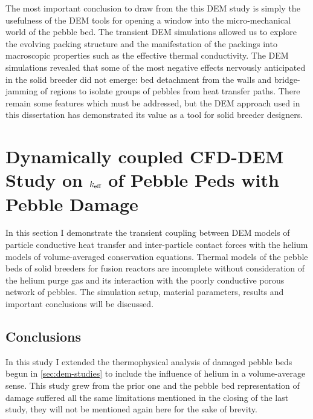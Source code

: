 The most important conclusion to draw from the this DEM study is simply the usefulness of the DEM tools for opening a window into the micro-mechanical world of the pebble bed. The transient DEM simulations allowed us to explore the evolving packing structure and the manifestation of the packings into macroscopic properties such as the effective thermal conductivity. The DEM simulations revealed that some of the most negative effects nervously anticipated in the solid breeder did not emerge: bed detachment from the walls and bridge-jamming of regions to isolate groups of pebbles from heat transfer paths. There remain some features which must be addressed, but the DEM approach used in this dissertation has demonstrated its value as a tool for solid breeder designers. 












\section{Dynamically coupled CFD-DEM Study on $k_\text{eff}$ of Pebble Peds with Pebble Damage}\label{sec:cfd-dem-studies}

In this section I demonstrate the transient coupling between DEM models of particle conductive heat transfer and inter-particle contact forces with the helium models of volume-averaged conservation equations. Thermal models of the pebble beds of solid breeders for fusion reactors are incomplete without consideration of the helium purge gas and its interaction with the poorly conductive porous network of pebbles. The simulation setup, material parameters, results and important conclusions will be discussed.





\subsection{Conclusions}

In this study I extended the thermophysical analysis of damaged pebble beds begun in \cref{sec:dem-studies} to include the influence of helium in a volume-average sense. This study grew from the prior one and the pebble bed representation of damage suffered all the same limitations mentioned in the closing of the last study, they will not be mentioned again here for the sake of brevity.

